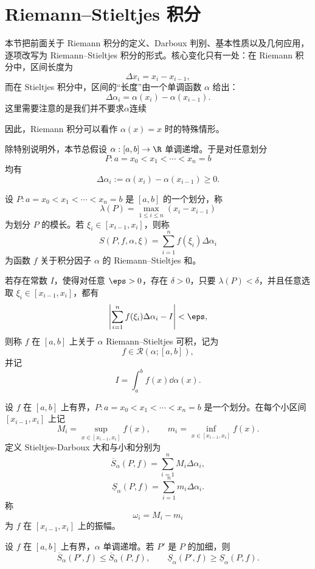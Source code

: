 \section{Riemann--Stieltjes 积分}

本节把前面关于 Riemann 积分的定义、Darboux 判别、基本性质以及几何应用，逐项改写为 Riemann--Stieltjes 积分的形式。核心变化只有一处：在 Riemann 积分中，区间长度为
\[
\Delta x_i=x_i-x_{i-1},
\]
而在 Stieltjes 积分中，区间的“长度”由一个单调函数 $\alpha$ 给出：
\[
\Delta \alpha_i=\alpha(x_i)-\alpha(x_{i-1}).
\]
这里需要注意的是我们并不要求$\alpha$连续

因此，Riemann 积分可以看作 $\alpha(x)=x$ 时的特殊情形。

除特别说明外，本节总假设 $\alpha:[a,b]\to\R$ 单调递增。于是对任意划分
\[
P:a=x_0<x_1<\cdots<x_n=b
\]
均有
\[
\Delta\alpha_i:=\alpha(x_i)-\alpha(x_{i-1})\geq 0.
\]

\begin{definition}
	设 $P:a=x_0<x_1<\cdots<x_n=b$ 是 $[a,b]$ 的一个划分，称
	\[
	\lambda(P)=\max_{1\leq i\leq n}(x_i-x_{i-1})
	\]
	为划分 $P$ 的模长。若 $\xi_i\in[x_{i-1},x_i]$，则称
	\[
	S(P,f,\alpha,\xi)=\sum_{i=1}^n f(\xi_i)\Delta\alpha_i
	\]
	为函数 $f$ 关于积分因子 $\alpha$ 的 Riemann--Stieltjes 和。
	
	若存在常数 $I$，使得对任意 $\eps>0$，存在 $\delta>0$，只要 $\lambda(P)<\delta$，并且任意选取 $\xi_i\in[x_{i-1},x_i]$，都有
	\[
	\left|\sum_{i=1}^n f(\xi_i)\Delta\alpha_i-I\right|<\eps,
	\]
	则称 $f$ 在 $[a,b]$ 上关于 $\alpha$ Riemann--Stieltjes 可积，记为
	\[
	f\in\mathcal R(\alpha;[a,b]),
	\]
	并记
	\[
	I=\int_a^b f(x)\dd\alpha(x).
	\]
\end{definition}

\begin{definition}
	设 $f$ 在 $[a,b]$ 上有界，$P:a=x_0<x_1<\cdots<x_n=b$ 是一个划分。在每个小区间 $[x_{i-1},x_i]$ 上记
	\[
	M_i=\sup_{x\in[x_{i-1},x_i]}f(x),\qquad
	m_i=\inf_{x\in[x_{i-1},x_i]}f(x).
	\]
	定义 Stieltjes-Darboux 大和与小和分别为
	\[
	\overline S_\alpha(P,f)=\sum_{i=1}^n M_i\Delta\alpha_i,
	\]
	\[
	\underline S_\alpha(P,f)=\sum_{i=1}^n m_i\Delta\alpha_i.
	\]
	称
	\[
	\omega_i=M_i-m_i
	\]
	为 $f$ 在 $[x_{i-1},x_i]$ 上的振幅。
\end{definition}

\begin{lemma}\label{lem:stieltjes-refinement}
	设 $f$ 在 $[a,b]$ 上有界，$\alpha$ 单调递增。若 $P'$ 是 $P$ 的加细，则
	\[
	\overline S_\alpha(P',f)\leq \overline S_\alpha(P,f),
	\qquad
	\underline S_\alpha(P',f)\geq \underline S_\alpha(P,f).
	\]
\end{lemma}

